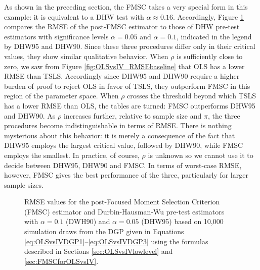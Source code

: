 As shown in the preceding section, the FMSC takes a very special form in this example: it is equivalent to a DHW test with $\alpha \approx 0.16$.
Accordingly, Figure \ref{fig:OLSvsIV_RMSEvsDHW} compares the RMSE of the post-FMSC estimator to those of DHW pre-test estimators with significance levels $\alpha = 0.05$ and $\alpha = 0.1$, indicated in the legend by DHW95 and DHW90.
Since these three procedures differ only in their critical values, they show similar qualitative behavior.
When $\rho$ is sufficiently close to zero, we saw from Figure \ref{fig:OLSvsIV_RMSEbaseline} that OLS has a lower RMSE than TSLS.
Accordingly since DHW95 and DHW90 require a higher burden of proof to reject OLS in favor of TSLS, they outperform FMSC in this region of the parameter space.
When $\rho$ crosses the threshold beyond which TSLS has a lower RMSE than OLS, the tables are turned: FMSC outperforms DHW95 and DHW90.
As $\rho$ increases further, relative to sample size and $\pi$, the three procedures become indistinguishable in terms of RMSE.
There is nothing mysterious about this behavior: it is merely a consequence of the fact that DHW95 employs the largest critical value, followed by DHW90, while FMSC employs the smallest.
In practice, of course, $\rho$ is unknown so we cannot use it to decide between DHW95, DHW90 and FMSC.
In terms of worst-case RMSE, however, FMSC gives the best performance of the three, particularly for larger sample sizes. 

\begin{figure}
\centering
	
	\caption{RMSE values for the post-Focused Moment Selection Criterion (FMSC) estimator and Durbin-Hausman-Wu pre-test estimators with $\alpha = 0.1$ (DWH90) and $\alpha = 0.05$ (DHW95) based on 10,000 simulation draws from the DGP given in Equations \ref{eq:OLSvsIVDGP1}--\ref{eq:OLSvsIVDGP3} using the formulas described in Sections \ref{sec:OLSvsIVlowlevel} and \ref{sec:FMSCforOLSvsIV}.}
	\label{fig:OLSvsIV_RMSEvsDHW}
\end{figure}